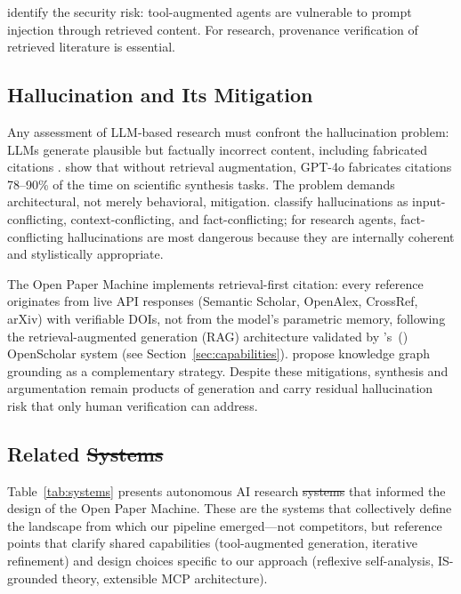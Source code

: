 \documentclass{article}
\providecommand{\DIFaddtex}[1]{{\protect\color{blue}\uwave{#1}}} %
\providecommand{\DIFdeltex}[1]{{\protect\color{red}\sout{#1}}}                      %
\providecommand{\DIFaddbegin}{} %
\providecommand{\DIFaddend}{} %
\providecommand{\DIFdelbegin}{} %
\providecommand{\DIFdelend}{} %
\providecommand{\DIFadd}[1]{\texorpdfstring{\DIFaddtex{#1}}{#1}} %
\providecommand{\DIFdel}[1]{\texorpdfstring{\DIFdeltex{#1}}{}} %
\newcommand{\DIFscaledelfig}{0.5}
\newlength{\DIFdelgraphicswidth} %
\newlength{\DIFdelgraphicsheight} %
\newcommand{\DIFaddincludegraphics}[2][]{{\color{blue}\fbox{\DIFOincludegraphics[#1]{#2}}}} %
\newcommand{\DIFdelincludegraphics}[2][]{%
\sbox{\DIFdelgraphicsbox}{\DIFOincludegraphics[#1]{#2}}%
\settoboxwidth{\DIFdelgraphicswidth}{\DIFdelgraphicsbox} %
\settoboxtotalheight{\DIFdelgraphicsheight}{\DIFdelgraphicsbox} %
\scalebox{\DIFscaledelfig}{%
\parbox[b]{\DIFdelgraphicswidth}{\usebox{\DIFdelgraphicsbox}\\[-\baselineskip] \rule{\DIFdelgraphicswidth}{0em}}\llap{\resizebox{\DIFdelgraphicswidth}{\DIFdelgraphicsheight}{%
\setlength{\unitlength}{\DIFdelgraphicswidth}%
\begin{picture}(1,1)%
\thicklines\linethickness{2pt} %
{\color[rgb]{1,0,0}\put(0,0){\framebox(1,1){}}}%
{\color[rgb]{1,0,0}\put(0,0){\line( 1,1){1}}}%
{\color[rgb]{1,0,0}\put(0,1){\line(1,-1){1}}}%
\end{picture}%
}\hspace*{3pt}}} %
} %
\DeclareRobustCommand{\DIFaddbegin}{\DIFOaddbegin \let\includegraphics\DIFaddincludegraphics} %
\DeclareRobustCommand{\DIFaddend}{\DIFOaddend \let\includegraphics\DIFOincludegraphics} %
\DeclareRobustCommand{\DIFdelbegin}{\DIFOdelbegin \let\includegraphics\DIFdelincludegraphics} %
\DeclareRobustCommand{\DIFdelend}{\DIFOaddend \let\includegraphics\DIFOincludegraphics} %
\begin{document}
\citet{greshake2023prompt} identify the security risk: tool-augmented agents are vulnerable to prompt injection through retrieved content. For research, provenance verification of retrieved literature is essential.

\subsection{Hallucination and Its Mitigation}

Any assessment of LLM-based research must confront the hallucination problem: LLMs generate plausible but factually incorrect content, including fabricated citations \citep{alkaissi2023hallucinations,zhang2025hallucination}. \citet{asai2024openscholar} show that without retrieval augmentation, GPT-4o fabricates citations 78--90\% of the time on scientific synthesis tasks. The problem demands architectural, not merely behavioral, mitigation. \citet{zhang2025hallucination} classify hallucinations as input-conflicting, context-conflicting, and fact-conflicting; for research agents, fact-conflicting hallucinations are most dangerous because they are internally coherent and stylistically appropriate.

The Open Paper Machine implements retrieval-first citation: every reference originates from live API responses (Semantic Scholar, OpenAlex, CrossRef, arXiv) with verifiable DOIs, not from the model's parametric memory, following the retrieval-augmented generation (RAG) architecture validated by \citeauthor{asai2024openscholar}'s~(\citeyear{asai2024openscholar}) OpenScholar system (see Section~\ref{sec:capabilities}). \citet{guan2024knowledge} propose knowledge graph grounding as a complementary strategy. Despite these mitigations, synthesis and argumentation remain products of generation and carry residual hallucination risk that only human verification can address.

\subsection{Related \DIFdelbegin \DIFdel{Systems}\DIFdelend \DIFaddbegin \DIFadd{Agents}\DIFaddend }

Table~\ref{tab:systems} presents autonomous AI research \DIFdelbegin \DIFdel{systems }\DIFdelend \DIFaddbegin \DIFadd{agents }\DIFaddend that informed the design of the Open Paper Machine. These are the systems that collectively define the landscape from which our pipeline emerged---not competitors, but reference points that clarify shared capabilities (tool-augmented generation, iterative refinement) and design choices specific to our approach (reflexive self-analysis, IS-grounded theory, extensible MCP architecture).
\end{document}
